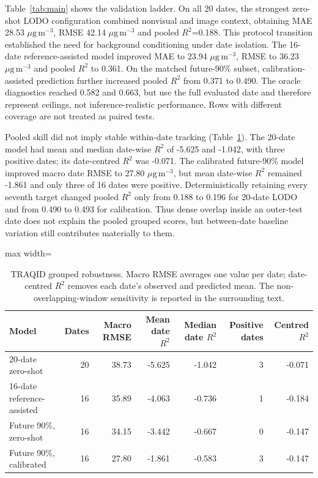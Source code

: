 \documentclass[review,12pt,authoryear]{elsarticle}
\newcommand{\ugm}{\ensuremath{\mu\mathrm{g}\,\mathrm{m}^{-3}}}
\newcommand{\Rtwo}{\ensuremath{R^2}}
\begin{document}
Table~\ref{tab:main} shows the validation ladder.
On all 20 dates, the strongest zero-shot LODO configuration combined nonvisual
and image context, obtaining MAE 28.53 \ugm, RMSE 42.14 \ugm{} and pooled
\Rtwo=0.188. This protocol transition established the need for background
conditioning under date isolation. The 16-date reference-assisted model improved
MAE to 23.94 \ugm, RMSE to 36.23 \ugm{} and pooled \Rtwo{} to 0.361. On the
matched future-90\% subset, calibration-assisted prediction further increased pooled
\Rtwo{} from 0.371 to 0.490. The oracle diagnostics reached 0.582 and 0.663,
but use the full evaluated date and therefore represent ceilings, not inference-realistic
performance. Rows with different coverage are not treated as paired tests.

Pooled skill did not imply stable within-date tracking
(Table~\ref{tab:traqid-grouped}). The 20-date model had mean and median
date-wise \Rtwo{} of -5.625 and -1.042, with three positive dates; its
date-centred \Rtwo{} was -0.071. The calibrated future-90\% model improved
macro date RMSE to 27.80 \ugm, but mean date-wise \Rtwo{} remained -1.861 and
only three of 16 dates were positive. Deterministically retaining every seventh
target changed pooled \Rtwo{} only from 0.188 to 0.196 for 20-date LODO and
from 0.490 to 0.493 for calibration. Thus dense overlap inside an outer-test
date does not explain the pooled grouped scores, but between-date baseline
variation still contributes materially to them.

\begin{table}[H]
\centering
\caption{TRAQID grouped robustness. Macro RMSE averages one value per date;
date-centred \Rtwo{} removes each date's observed and predicted mean. The
non-overlapping-window sensitivity is reported in the surrounding text.}
\label{tab:traqid-grouped}
\begin{adjustbox}{max width=\textwidth}
\begin{tabular}{lrrrrrr}
\toprule
Model & Dates & Macro RMSE & Mean date \Rtwo & Median date \Rtwo & Positive dates & Centred \Rtwo \\
\midrule
20-date zero-shot & 20 & 38.73 & -5.625 & -1.042 & 3 & -0.071 \\
16-date reference-assisted & 16 & 35.89 & -4.063 & -0.736 & 1 & -0.184 \\
Future 90\%, zero-shot & 16 & 34.15 & -3.442 & -0.667 & 0 & -0.147 \\
Future 90\%, calibrated & 16 & 27.80 & -1.861 & -0.583 & 3 & -0.147 \\
\bottomrule
\end{tabular}
\end{adjustbox}
\end{table}
\end{document}
